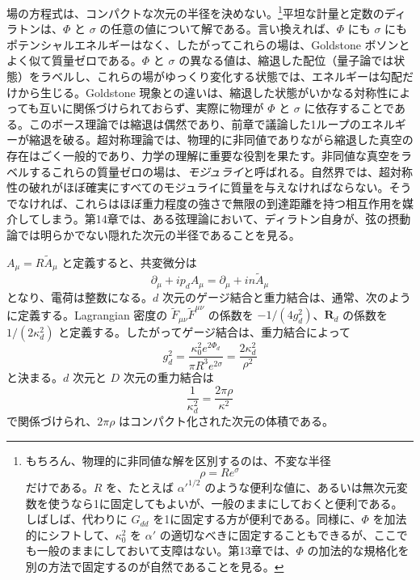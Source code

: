 場の方程式は、コンパクトな次元の半径を決めない。\footnote[1]{もちろん、物理的に非同値な解を区別するのは、不変な半径
\[
\rho=Re^\sigma
\]
だけである。$R$ を、たとえば $\alpha'^{1/2}$ のような便利な値に、あるいは無次元変数を使うなら1に固定してもよいが、一般のままにしておくと便利である。しばしば、代わりに $G_{dd}$ を1に固定する方が便利である。同様に、$\Phi$ を加法的にシフトして、$\kappa_0^2$ を $\alpha'$ の適切なべきに固定することもできるが、ここでも一般のままにしておいて支障はない。第13章では、$\Phi$ の加法的な規格化を別の方法で固定するのが自然であることを見る。}平坦な計量と定数のディラトンは、$\Phi$ と $\sigma$ の任意の値について解である。言い換えれば、$\Phi$ にも $\sigma$ にもポテンシャルエネルギーはなく、したがってこれらの場は、Goldstone ボソンとよく似て質量ゼロである。$\Phi$ と $\sigma$ の異なる値は、縮退した配位（量子論では状態）をラベルし、これらの場がゆっくり変化する状態では、エネルギーは勾配だけから生じる。Goldstone 現象との違いは、縮退した状態がいかなる対称性によっても互いに関係づけられておらず、実際に物理が $\Phi$ と $\sigma$ に依存することである。このボース理論では縮退は偶然であり、前章で議論した1ループのエネルギーが縮退を破る。超対称理論では、物理的に非同値でありながら縮退した真空の存在はごく一般的であり、力学の理解に重要な役割を果たす。非同値な真空をラベルするこれらの質量ゼロの場は、\emph{モジュライ}と呼ばれる。自然界では、超対称性の破れがほぼ確実にすべてのモジュライに質量を与えなければならない。そうでなければ、これらはほぼ重力程度の強さで無限の到達距離を持つ相互作用を媒介してしまう。第14章では、ある弦理論において、ディラトン自身が、弦の摂動論では明らかでない隠れた次元の半径であることを見る。

$A_\mu=R\widetilde A_\mu$ と定義すると、共変微分は
\begin{equation}
\partial_\mu+ip_dA_\mu=\partial_\mu+in\widetilde A_\mu
\tag{8.1.10}\label{eq:8.1.10}
\end{equation}
となり、電荷は整数になる。$d$ 次元のゲージ結合と重力結合は、通常、次のように定義する。Lagrangian 密度の $\widetilde F_{\mu\nu}\widetilde F^{\mu\nu}$ の係数を $-1/(4g_d^2)$、$\bm R_d$ の係数を $1/(2\kappa_d^2)$ と定義する。したがってゲージ結合は、重力結合によって
\begin{equation}
g_d^2=\frac{\kappa_0^2e^{2\Phi_d}}{\pi R^3e^{2\sigma}}
=\frac{2\kappa_d^2}{\rho^2}
\tag{8.1.11}\label{eq:8.1.11}
\end{equation}
と決まる。$d$ 次元と $D$ 次元の重力結合は
\begin{equation}
\frac1{\kappa_d^2}=\frac{2\pi\rho}{\kappa^2}
\tag{8.1.12}\label{eq:8.1.12}
\end{equation}
で関係づけられ、$2\pi\rho$ はコンパクト化された次元の体積である。

